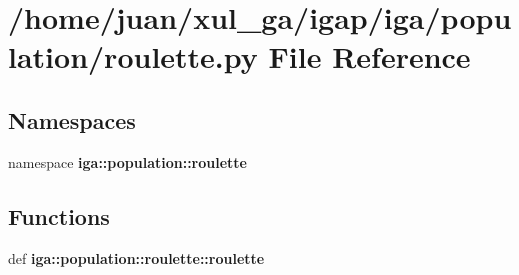 \section{/home/juan/xul\_\-ga/igap/iga/population/roulette.py File Reference}
\label{roulette_8py}
\subsection*{Namespaces}
\begin{CompactItemize}
\item 
namespace {\bf iga::population::roulette}
\end{CompactItemize}
\subsection*{Functions}
\begin{CompactItemize}
\item 
def {\bf iga::population::roulette::roulette}
\end{CompactItemize}
